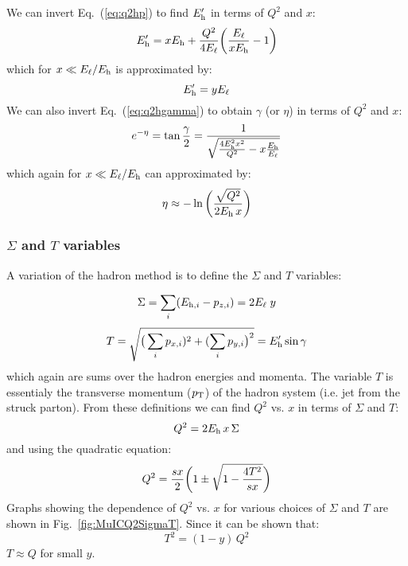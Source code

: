 \documentclass[12pt]{article}
\begin{document}
We can invert Eq.~(\ref{eq:q2hp}) to find $E^\prime_{\rm h}$ in terms of $Q^2$ and $x$:
%
\begin{equation}
E^\prime_{\rm h}  = xE_{\rm h} + {Q^2 \over 4 E_\ell}\bigg({E_\ell \over x E_{\rm h}} - 1 \bigg)
\label{eq:hp}
\end{equation}
%
which for $x \ll E_\ell/E_{\rm h}$ is approximated by:
%
\begin{equation}
E^\prime_{\rm h}  = yE_\ell 
\end{equation}
%
We can also invert Eq.~(\ref{eq:q2hgamma}) to obtain $\gamma$ (or $\eta$) in terms of $Q^2$ and $x$:
%
\begin{equation}
e^{-\eta} = \tan {\gamma \over 2}   = { 1 \over \sqrt{{4E_{\rm h}^2 x^2 \over Q^2} - x {E_{\rm h} \over E_\ell} }  }  
\label{eq:gamma}
\end{equation}
%
which again for $x \ll E_\ell/E_{\rm h}$ can approximated by:
%
\begin{equation}
\eta \approx -\ln \bigg( {\sqrt{Q^2} \over 2 E_{\rm h}\, x } \bigg)
\end{equation}
%

\subsubsection{$\Sigma$ and $T$ variables}

A variation of the hadron method is to define the $\Sigma$ and $T$
variables:

\begin{equation}
\Sigma = \sum_i (E_{{\rm h},i}-p_{z,i}) =  2 E_\ell\; y
  \label{eq:sigma}
\end{equation}
%
\begin{equation}
T = \sqrt{  \big(\sum_i p_{x,i})^2 + (\sum_i p_{y,i} \big)^2  } = E^\prime_{\rm h} \sin\gamma
  \label{eq:T}
\end{equation}
%
which again are sums over the  hadron energies and momenta. The
variable $T$ is essentialy the transverse momentum ($p_{\rm T}$) of
the hadron system (i.e. jet from the struck parton). From these definitions
we can find $Q^2$ vs. $x$ in terms of $\Sigma$ and $T$:
%
\begin{equation}
Q^2 = 2 E_{\rm h} \, x\, \Sigma
  \label{eq:Q2Sigma}
\end{equation}
%
and using the quadratic equation:
%
\begin{equation}
Q^2 = {s x \over 2} \bigg(1 \pm \sqrt{1-{4T^2\over sx}}  \bigg)
  \label{eq:Q2T}
\end{equation}
%
Graphs showing the dependence of $Q^2$ vs. $x$ for various choices of
$\Sigma$ and $T$ are shown in Fig.~\ref{fig:MuICQ2SigmaT}.
Since it can be shown that:
%
\begin{equation}
T^2 =  (1-y)\,Q^2 
\end{equation}
%
$T \approx Q$ for small $y$.
\end{document}
